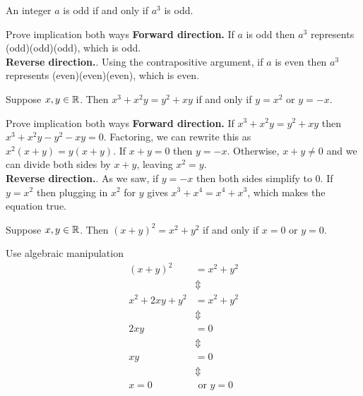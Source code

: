 \documentclass{article}
\begin{document}
\begin{problem}
An integer $a$ is odd if and only if $a^3$ is odd.
\end{problem}

\begin{solution}{Prove implication both ways}
    \textbf{Forward direction.} If $a$ is odd then $a^3$ represents (odd)(odd)(odd), which is odd.
    \\
    \textbf{Reverse direction.}. Using the contrapositive argument, if $a$ is even then $a^3$ represents (even)(even)(even), which is even.
\end{solution}

\begin{problem}
Suppose $x, y \in \mathbb{R}$. Then $x^3 + x^2 y = y^2 + xy$ if and only if $y = x^2$ or $y = -x$.
\end{problem}
\begin{solution}{Prove implication both ways}
    \textbf{Forward direction.} If $x^3 + x^2 y = y^2 + xy$ then $x^3 + x^2 y - y^2 - xy = 0$. Factoring, we can rewrite this as $x^2(x + y) = y(x + y)$. If $x + y = 0$ then $y = -x$. Otherwise, $x + y \neq 0$ and we can divide both sides by $x + y$, leaving $x^2 = y$.
    \\
    \textbf{Reverse direction.}. As we saw, if $y = -x$ then both sides simplify to 0. If $y = x^2$ then plugging in $x^2$ for $y$ gives $x^3 + x^4 = x^4 + x^3$, which makes the equation true.
\end{solution}

\begin{problem}
Suppose $x, y \in \mathbb{R}$. Then $(x+y)^2 = x^2 + y^2$ if and only if $x = 0$ or $y = 0$.
\end{problem}
\begin{solution}{Use algebraic manipulation}
    \begin{align*}
        (x+y)^2         & = x^2 + y^2       \\
                        & \Updownarrow      \\
        x^2 + 2xy + y^2 & = x^2 + y^2       \\
                        & \Updownarrow      \\
        2xy             & = 0               \\
                        & \Updownarrow      \\
        xy              & = 0               \\
                        & \Updownarrow      \\
        x = 0           & \text{ or } y = 0
    \end{align*}
\end{solution}
\end{document}
